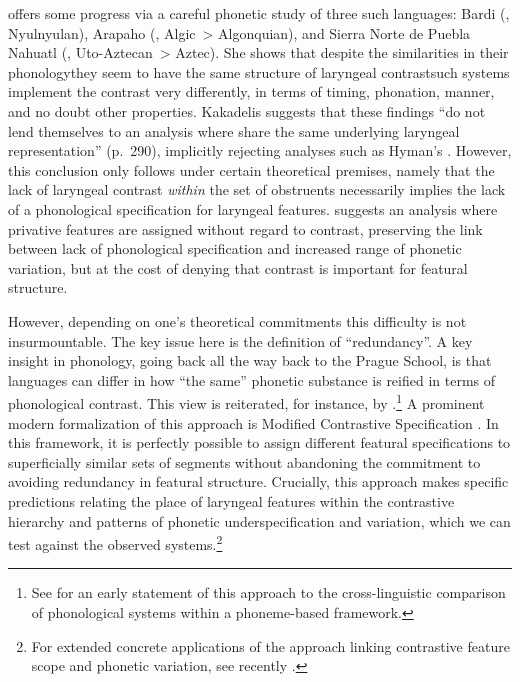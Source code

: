 \documentclass[output=paper,colorlinks,citecolor=brown]{langscibook}
\begin{document}
\textcite{kakadelis2018phonetic} offers some progress via a careful phonetic study of three such languages: Bardi (, Nyulnyulan), Arapaho (, Algic~> Algonquian), and Sierra Norte de Puebla Nahuatl (, Uto-Aztecan~> Aztec). She shows that despite the similarities in their phonology\dash they seem to have the same structure of laryngeal contrast\dash such systems implement the contrast very differently, in terms of timing, phonation, manner, and no doubt other properties. Kakadelis suggests that these findings \enquote{do not lend themselves to an analysis where  share the same underlying laryngeal representation} (p.~290), implicitly rejecting analyses such as Hyman’s \parencite*{hyman08:_univer}. However, this conclusion only follows under certain theoretical premises, namely that the lack of laryngeal contrast \emph{within} the set of obstruents necessarily implies the lack of a phonological specification for laryngeal features. \textcite{kakadelis2018phonetic} suggests an analysis where privative features are assigned without regard to contrast, preserving the link between lack of phonological specification and increased range of phonetic variation, but at the cost of denying that contrast is important for featural structure.

However, depending on one’s theoretical commitments this difficulty is not insurmountable. The key issue here is the definition of \enquote{redundancy}. A key insight in phonology, going back all the way back to the Prague School, is that languages can differ in how \enquote{the same} phonetic substance is reified in terms of phonological contrast. This view is reiterated, for instance, by \textcite{lass1984vowel,simpson99:_fundam,vaux2009}.\footnote{See \textcite{trubetzkoy1931phonologie} for an early statement of this approach to the cross-linguistic comparison of phonological systems within a phoneme-based framework.} A prominent modern formalization of this approach is Modified Contrastive Specification \parencite{dresher09}. In this framework, it is perfectly possible to assign different featural specifications to superficially similar sets of segments without abandoning the commitment to avoiding redundancy in featural structure. Crucially, this approach makes specific predictions relating the place of laryngeal features within the contrastive hierarchy and patterns of phonetic underspecification and variation, which we can test against the observed systems.\footnote{For extended concrete applications of the approach linking contrastive feature scope and phonetic variation, see recently \textcite{dresher2018contrastive, natvig2018contrast,Purnell2019}.}
\end{document}
